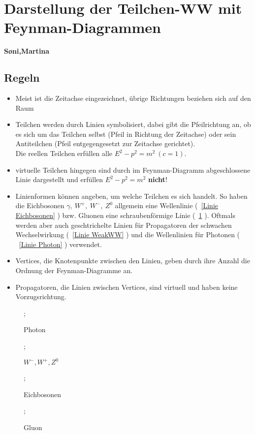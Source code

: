 \documentclass[Ex4_Zusammenfassung.tex]{subfiles}
\begin{document}
\section{Darstellung der Teilchen-WW mit Feynman-Diagrammen}
\textbf{S\o{}ni,Martina}
	\subsection{Regeln}
	
	\begin{itemize}
		\item Meist ist die Zeitachse eingezeichnet, übrige Richtungen beziehen sich auf den Raum
		\item Teilchen werden durch Linien symbolisiert, dabei gibt die Pfeilrichtung an, ob es sich um das Teilchen selbst (Pfeil in Richtung der Zeitachse) oder sein Antiteilchen (Pfeil entgegengesetzt zur Zeitachse gerichtet).\\
		Die reellen Teilchen erfüllen alle $E^2 - p^2 = m^2\ (c=1)$.
		\item virtuelle Teilchen hingegen sind durch im Feynman-Diagramm abgeschlossene Linie dargestellt und erfüllen $E^2 - p^2 = m^2$ \textbf{nicht}!
		\item Linienformen können angeben, um welche Teilchen es sich handelt. So haben die Eichbosonen $\gamma,\ W^+,\ W^-,\ Z^0$ allgemein eine Wellenlinie (~\ref{Linie Eichbosonen} ) bzw. Gluonen eine schraubenförmige Linie (~\ref{Linie Gluon} ). Oftmals werden aber auch geschtrichelte Linien für Propagatoren der schwachen Wechselwirkung (~\ref{Linie WeakWW} ) und die Wellenlinien für Photonen ( ~\ref{Linie Photon} ) verwendet.
		\item Vertices, die Knotenpunkte zwischen den Linien, geben durch ihre Anzahl die Ordnung der Feynman-Diagramme an.
		\item Propagatoren, die Linien zwischen Vertices, sind virtuell und haben keine Vorzugsrichtung.
	\end{itemize}
	
	\begin{figure}[h]
		\centering
		;
		\caption{Photon}
		\label{Linie Photon}

		;
		\caption{$W^-,W^+,Z^0$}
		\label{Linie WeakWW} 
		
		;
				\caption{Eichbosonen}
				\label{Linie Eichbosonen}
		
		;
		\caption{Gluon}
		\label{Linie Gluon}
	\end{figure}
	
\end{document}
